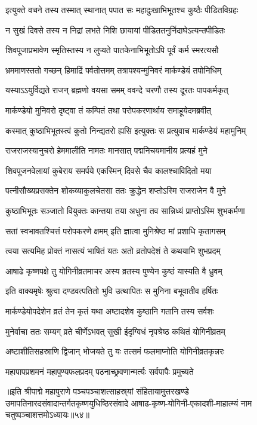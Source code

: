 \twolineshloka
{इत्युक्ते वचने तस्य तस्मात् स्थानात् पपात सः}
{महादुःखाभिभूतश्च कुष्ठैः पीडितविग्रहः}%

\twolineshloka
{न सुखं दिवसे तस्य न निद्रां लभते निशि}
{छायायां पीडिततनुर्निदाघेऽत्यन्तपीडितः}%

\twolineshloka
{शिवपूजाप्रभावेण स्मृतिस्तस्य न लुप्यते}
{पातकेनाभिभूतोऽपि पूर्वं कर्म स्मरत्यसौ}%

\twolineshloka
{भ्रममाणस्ततो गच्छन् हिमाद्रिं पर्वतोत्तमम्}
{तत्रापश्यन्मुनिवरं मार्कण्डेयं तपोनिधिम्}%

\twolineshloka
{यस्याऽऽयुर्विद्यते राजन् ब्रह्मणो वयसा समम्}
{ववन्दे चरणौ तस्य दूरतः पापकर्मकृत्}%

\twolineshloka
{मार्कण्डेयो मुनिवरो दृष्ट्वा तं कम्पितं तथा}
{परोपकरणार्थाय समाहूयेदमब्रवीत्}%

\twolineshloka
{कस्मात् कुष्ठाभिभूतस्त्वं कुतो निन्द्यतरो ह्यसि}
{इत्युक्तः स प्रत्युवाच मार्कण्डेयं महामुनिम्}%


\twolineshloka
{राजराजस्यानुचरो हेममालीति नामतः}
{मानसात् पद्मनिचयमानीय प्रत्यहं मुने}%

\twolineshloka
{शिवपूजनवेलायां कुबेराय समर्पये}
{एकस्मिन् दिवसे चैव कालश्चाविदितो मया}%

\twolineshloka
{पत्नीसौख्यप्रसक्तेन शोकव्याकुलचेतसा}
{ततः क्रुद्धेन शप्तोऽस्मि राजराजेन वै मुने}%

\twolineshloka
{कुष्ठाभिभूतः सञ्जातो वियुक्तः कान्तया तया}
{अधुना तव सान्निध्यं प्राप्तोऽस्मि शुभकर्मणा}%

\twolineshloka
{सतां स्वभावतश्चित्तं परोपकरणे क्षमम्}
{इति ज्ञात्वा मुनिश्रेष्ठ मां प्रशाधि कृतागसम्}%


\twolineshloka
{त्वया सत्यमिह प्रोक्तं नासत्यं भाषितं यतः}
{अतो व्रतोपदेशं ते कथयामि शुभप्रदम्}%

\twolineshloka
{आषाढे कृष्णपक्षे तु योगिनीव्रतमाचर}
{अस्य व्रतस्य पुण्येन कुष्ठं यास्यति वै ध्रुवम्}%

\twolineshloka
{इति वाक्यमृषेः श्रुत्वा दण्डवत्पतितो भुवि}
{उत्थापितः स मुनिना बभूवातीव हर्षितः}%

\twolineshloka
{मार्कण्डेयोपदेशेन व्रतं तेन कृतं यथा}
{अष्टादशेव कुष्ठानि गतानि तस्य सर्वशः}%

\twolineshloka
{मुनेर्वाचा ततः सम्यग् व्रते चीर्णेऽभवत् सुखी}
{ईदृग्विधं नृपश्रेष्ठ कथितं योगिनीव्रतम्}%

\twolineshloka
{अष्टाशीतिसहस्राणि द्विजान् भोजयते तु यः}
{तत्समं फलमाप्नोति योगिनीव्रतकृन्नरः}%

\twolineshloka
{महापापप्रशमनं महापुण्यफलप्रदम्}
{पठनाच्छ्रवणान्मर्त्यः सर्वपापैः प्रमुच्यते}%

॥इति श्रीपाद्मे महापुराणे पञ्चपञ्चाशत्साहस्र्यां संहितायामुत्तरखण्डे उमापतिनारदसंवादान्तर्गतकृष्णयुधिष्ठिरसंवादे आषाढ-कृष्ण-योगिनी-एकादशी-माहात्म्यं नाम चतुष्पञ्चाशत्तमोऽध्यायः॥५४॥

\genMangalaShloka

\hyperref[sec:ekadashi_mahatmyam_padma_puranam]{\closesub}
\clearpage

